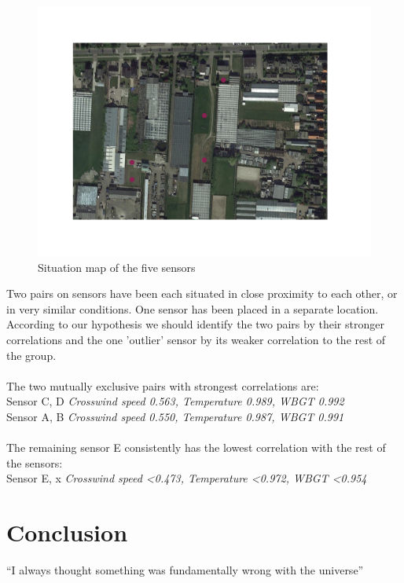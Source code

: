 \documentclass{article}
\begin{document}
\begin{figure}[!htb]
\centering
\includegraphics[width=\textwidth, trim={4cm 6cm 4cm 6cm}, clip]{3-3-map.png}
\caption{Situation map of the five sensors}
\label{fig:3-3}
\end{figure}

Two pairs on sensors have been each situated in close proximity to each other, or in very similar conditions. One sensor has been placed in a separate location. According to our hypothesis we should identify the two pairs by their stronger correlations and the one 'outlier' sensor by its weaker correlation to the rest of the group.
\\
\\The two mutually exclusive pairs with strongest correlations are:
\\ \quad Sensor C, D   \quad   \emph{Crosswind speed 0.563,   Temperature 0.989,   WBGT 0.992}
\\ \quad Sensor A, B   \quad   \emph{Crosswind speed 0.550,   Temperature 0.987,   WBGT 0.991}
\\
\\The remaining sensor E consistently has the lowest correlation with the rest of the sensors:
\\ \quad Sensor E, x   \quad   \emph{Crosswind speed \textless0.473,   Temperature \textless0.972,   WBGT \textless0.954}








\section{Conclusion}
``I always thought something was fundamentally wrong with the universe''
\end{document}
